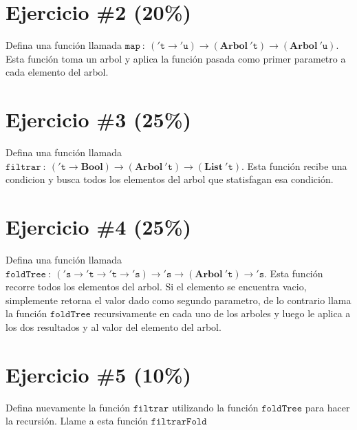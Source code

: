 \documentclass{article}
\begin{document}
\section*{Ejercicio \#2 (20\%)}

Defina una funci\'on llamada $\mathtt{map}\ :\ (\mathtt{'t}\rightarrow\mathtt{'u})\rightarrow
(\mathbf{Arbol}\ \mathtt{'t}) \rightarrow (\mathbf{Arbol}\ \mathtt{'u})$. Esta funci\'on toma un arbol y aplica la funci\'on
pasada como primer parametro a cada elemento del arbol.

\section*{Ejercicio \#3 (25\%)}

Defina una funci\'on llamada $\mathtt{filtrar}\ :\ (\mathtt{'t}\rightarrow\mathbf{Bool})\rightarrow (\mathbf{Arbol}\ \mathtt{'t})
\rightarrow (\mathbf{List}\ \mathtt{'t})$. Esta funci\'on recibe una condicion y busca todos los elementos
del arbol que statisfagan esa condici\'on.

\section*{Ejercicio \#4 (25\%)}

Defina una funci\'on llamada $\mathtt{foldTree}\ :\ (\mathtt{'s}\rightarrow\mathtt{'t}
\rightarrow\mathtt{'t}\rightarrow\mathtt{'s})\rightarrow\mathtt{'s}\rightarrow(\mathbf{Arbol}\ \mathtt{'t})\rightarrow
\mathtt{'s}$.
Esta funci\'on recorre todos los elementos del arbol. Si el elemento se encuentra vacio,
simplemente retorna el valor dado como segundo parametro, de lo contrario llama la funci\'on
$\mathtt{foldTree}$ recursivamente en cada uno de los arboles y luego le aplica a los
dos resultados y al valor del elemento del arbol.

\section*{Ejercicio \#5 (10\%)}

Defina nuevamente la funci\'on $\mathtt{filtrar}$ utilizando la funci\'on $\mathtt{foldTree}$ para
hacer la recursi\'on. Llame a esta funci\'on $\mathtt{filtrarFold}$
\end{document}
